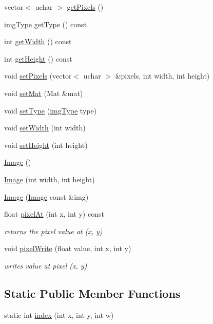 \begin{DoxyCompactItemize}
\item 
vector$<$ uchar $>$ \hyperlink{class_image_a967ec7a693253014cc8ade9eee1b1c12}{get\-Pixels} ()
\item 
\hyperlink{class_image_a053e7160b6567c4929de1cae9a911581}{img\-Type} \hyperlink{class_image_a31258142b60882231d1b8ba999cd6d88}{get\-Type} () const 
\item 
int \hyperlink{class_image_adbe5f8b9f79338c7eb6a66bdc69ca0b7}{get\-Width} () const 
\item 
int \hyperlink{class_image_a45dd31ebd02682c5963858f62aa53dd9}{get\-Height} () const 
\item 
void \hyperlink{class_image_ab0a38137a9077dc382bbbdd00efcc70b}{set\-Pixels} (vector$<$ uchar $>$ \&pixels, int width, int height)
\item 
void \hyperlink{class_image_a1c0874758106668b22c312fe9904cbfe}{set\-Mat} (Mat \&mat)
\item 
void \hyperlink{class_image_a1e881fec68466ad342c6a85cff07a42f}{set\-Type} (\hyperlink{class_image_a053e7160b6567c4929de1cae9a911581}{img\-Type} type)
\item 
void \hyperlink{class_image_a2087192970c1d0358e6d7d96d940ed18}{set\-Width} (int width)
\item 
void \hyperlink{class_image_a031c156741deddb462c0c3cc0b7c1251}{set\-Height} (int height)
\item 
\hyperlink{class_image_a58edd1c45b4faeb5f789b0d036d02313}{Image} ()
\item 
\hyperlink{class_image_afb0339b802ed560e69eb07358d30198f}{Image} (int width, int height)
\item 
\hyperlink{class_image_a11c4da10d93cb19f684f5dbec08e564d}{Image} (\hyperlink{class_image}{Image} const \&img)
\item 
float \hyperlink{class_image_a9b183ad498d8ffea3f91a21e5a67920d}{pixel\-At} (int x, int y) const 
\begin{DoxyCompactList}\small\item\em returns the pixel value at (x, y) \end{DoxyCompactList}\item 
void \hyperlink{class_image_afcd6f049060759d996f08b335ef2351d}{pixel\-Write} (float value, int x, int y)
\begin{DoxyCompactList}\small\item\em writes value at pixel (x, y) \end{DoxyCompactList}\end{DoxyCompactItemize}
\subsection*{Static Public Member Functions}
\begin{DoxyCompactItemize}
\item 
static int \hyperlink{class_image_a990667d3006b26e839421d76cfb8d1d9}{index} (int x, int y, int w)
\end{DoxyCompactItemize}
